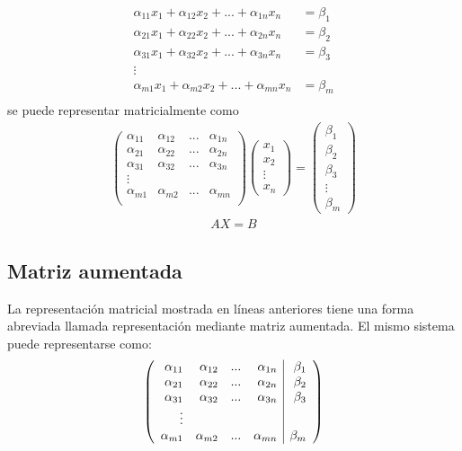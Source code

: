 \begin{align*}
\alpha_{11} x_1+\alpha_{12} x_2+...+\alpha_{1n} x_n&=\beta_1\\
\alpha_{21} x_1+\alpha_{22} x_2+...+\alpha_{2n} x_n&=\beta_2\\
\alpha_{31} x_1+\alpha_{32} x_2+...+\alpha_{3n} x_n&=\beta_3\\
\vdots\\
\alpha_{m1} x_1+\alpha_{m2} x_2+...+\alpha_{mn} x_n&=\beta_m\\
\end{align*} 
se puede representar matricialmente como
\begin{align*}
\left(
\begin{array}{rrrr}
\alpha_{11} &\alpha_{12} &...&\alpha_{1n} \\
\alpha_{21} &\alpha_{22} &...&\alpha_{2n} \\
\alpha_{31} &\alpha_{32} &...&\alpha_{3n} \\
\vdots&&&\\
\alpha_{m1} &\alpha_{m2} &...&\alpha_{mn}\\
\end{array}
\right)
\left(
\begin{array}{r}
x_1\\x_2\\\vdots\\x_n
\end{array}
\right)
=
\left(
\begin{array}{r}
\beta_1\\\beta_2\\\beta_3\\\vdots\\\beta_m
\end{array}
\right)
\end{align*} 
\begin{align*}
AX=B
\end{align*}
\subsection{Matriz aumentada}
La representación matricial mostrada en líneas anteriores tiene una forma abreviada llamada representación mediante matriz aumentada. El mismo sistema puede representarse como:
\begin{align*}
\reducir{rrrr|r}{
\alpha_{11} &\alpha_{12} &...&\alpha_{1n}&\beta_1 \\
\alpha_{21} &\alpha_{22} &...&\alpha_{2n}&\beta_2 \\
\alpha_{31} &\alpha_{32} &...&\alpha_{3n}&\beta_3 \\
\vdots&&&\\
\alpha_{m1} &\alpha_{m2} &...&\alpha_{mn}&\beta_m\\
}
\end{align*}

